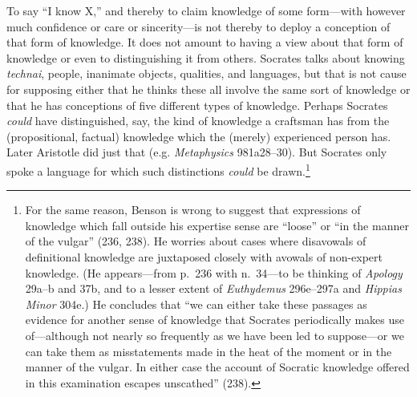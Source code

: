 ﻿\documentclass[11pt]{amsart}
\begin{document}
To say ``I know X,'' and thereby to claim knowledge of some form---with however much confidence or care or sincerity---is not thereby to deploy a conception of that form of knowledge. It does not amount to having a view about that form of knowledge or even to distinguishing it from others. Socrates talks about knowing \emph{technai}, people, inanimate objects, qualities, and languages, but that is not cause for supposing either that he thinks these all involve the same sort of knowledge or that he has conceptions of five different types of knowledge. Perhaps Socrates \emph{could} have distinguished, say, the kind of knowledge a craftsman has from the (propositional, factual) knowledge which the (merely) experienced person has. Later Aristotle did just that (e.g. \emph{Metaphysics} 981a28--30). But Socrates only spoke a language for which such distinctions \emph{could} be drawn.\footnote{For the same reason, Benson is wrong to suggest that expressions of knowledge which fall outside his expertise sense are ``loose'' or ``in the manner of the vulgar'' (236, 238). He worries about cases where disavowals of definitional knowledge are juxtaposed closely with avowals of non-expert knowledge. (He appears---from p.~236 with n.~34---to be thinking of \emph{Apology} 29a--b and 37b, and to a lesser extent of \emph{Euthydemus} 296e--297a and \emph{Hippias Minor} 304e.) He concludes that ``we can either take these passages as evidence for another sense of knowledge that Socrates periodically makes use of---although not nearly so frequently as we have been led to suppose---or we can take them as misstatements made in the heat of the moment or in the manner of the vulgar. In either case the account of Socratic knowledge offered in this examination escapes unscathed'' (238).} 







\end{document}
